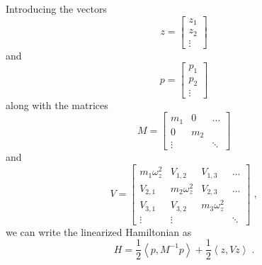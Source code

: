 \documentclass[aps, pra, preprint]{revtex4-1}
\begin{document}
Introducing the vectors
\begin{equation}
  z=\left[
    \begin{array}{c}
      z_1\\
      z_2\\
      \vdots
    \end{array}
  \right]
\end{equation}
and
\begin{equation}
  p=\left[
    \begin{array}{c}
      p_1\\
      p_2\\
      \vdots
    \end{array}
  \right]
\end{equation}
along with the matrices
\begin{equation}
  M=\left[
    \begin{array}{ccc}
      m_1&0&\hdots\\
      0&m_2&\\
      \vdots&&\ddots
    \end{array}
  \right]
\end{equation}
and
\begin{equation}
  V=\left[
    \begin{array}{cccc}
      m_1\omega_z^2&V_{1,2}&V_{1,3}&\hdots\\
      V_{2,1}&m_2\omega_z^2&V_{2,3}&\hdots\\
      V_{3,1}&V_{3,2}&m_3\omega_z^2&\\
      \vdots&\vdots&&\ddots
    \end{array}
  \right]\;,
\end{equation}
we can write the linearized Hamiltonian as
\begin{equation}
  H =
  \frac{1}{2}\left\langle p, M^{-1}p \right\rangle +
  \frac{1}{2}\left\langle z, V z \right \rangle\;.
  \label{eqn:linearized_hamiltonian}
\end{equation}
\end{document}

